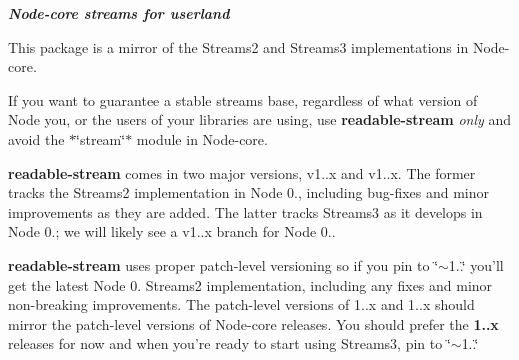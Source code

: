 {\itshape {\bfseries Node-\/core streams for userland}}

\href{https://nodei.co/npm/readable-stream/}{\tt } \href{https://nodei.co/npm/readable-stream/}{\tt }

This package is a mirror of the Streams2 and Streams3 implementations in Node-\/core.

If you want to guarantee a stable streams base, regardless of what version of Node you, or the users of your libraries are using, use {\bfseries readable-\/stream} {\itshape only} and avoid the $\ast$\char`\"{}stream\char`\"{}$\ast$ module in Node-\/core.

{\bfseries readable-\/stream} comes in two major versions, v1..\+x and v1..\+x. The former tracks the Streams2 implementation in Node 0., including bug-\/fixes and minor improvements as they are added. The latter tracks Streams3 as it develops in Node 0.; we will likely see a v1..\+x branch for Node 0..

{\bfseries readable-\/stream} uses proper patch-\/level versioning so if you pin to {\ttfamily \char`\"{}$\sim$1..\char`\"{}} you’ll get the latest Node 0. Streams2 implementation, including any fixes and minor non-\/breaking improvements. The patch-\/level versions of 1..\+x and 1..\+x should mirror the patch-\/level versions of Node-\/core releases. You should prefer the {\bfseries 1..\+x} releases for now and when you’re ready to start using Streams3, pin to {\ttfamily \char`\"{}$\sim$1..\char`\"{}} 